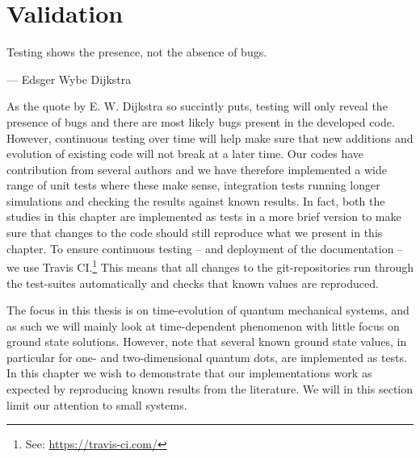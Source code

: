 \chapter{Validation}
    \label{chap:validation}
    \epigraph{Testing shows the presence, not the absence of bugs.}
    {--- Edsger Wybe Dijkstra}

    As the quote by E. W. Dijkstra so succintly puts, testing will only reveal
    the presence of bugs and there are most likely bugs present in the developed
    code.
    However, continuous testing over time will help make sure that new additions
    and evolution of existing code will not break at a later time.
    Our codes have contribution from several authors and we have therefore
    implemented a wide range of unit tests where these make sense, integration
    tests running longer simulations and checking the results against known
    results.
    In fact, both the studies in this chapter are implemented as tests in a more
    brief version to make sure that changes to the code should still reproduce
    what we present in this chapter.
    To ensure continuous testing -- and deployment of the documentation --
    we use Travis CI.\footnote{%
        See: \url{https://travis-ci.com/}
    }
    This means that all changes to the git-repositories run through the
    test-suites automatically and checks that known values are reproduced.

    The focus in this thesis is on time-evolution of quantum mechanical systems,
    and as such we will mainly look at time-dependent phenomenon with little
    focus on ground state solutions.
    However, note that several known ground state values, in particular for one-
    and two-dimensional quantum dots, are implemented as tests.
    In this chapter we wish to demonstrate that our implementations work as
    expected by reproducing known results from the literature.
    We will in this section limit our attention to small systems.

